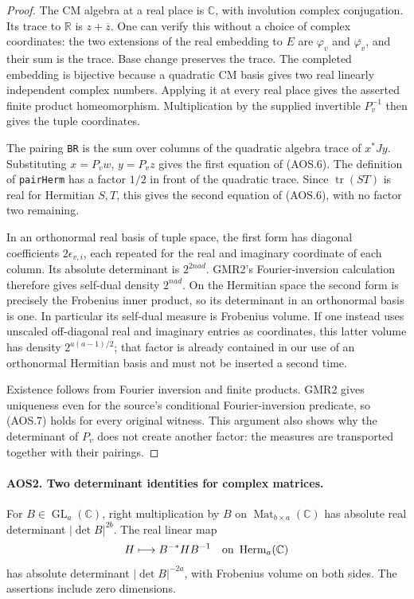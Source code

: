 \documentclass[11pt,a4paper]{article}
\numberwithin{equation}{section}
\theoremstyle{remark}\newtheorem{remark}[theorem]{Remark}
\begin{document}
\begin{proof}
The CM algebra at a real place is $\mathbb C$, with involution complex
conjugation.  Its trace to $\mathbb R$ is $z+\overline z$.
One can verify this without a choice of complex coordinates: the two
extensions of the real embedding to $E$ are $\varphi_v$ and
$\overline{\varphi_v}$, and their sum is the trace.  Base change
preserves the trace.  The completed embedding is bijective because a
quadratic CM basis gives two real linearly independent complex
numbers.  Applying it at every real place gives the asserted finite
product homeomorphism.  Multiplication by the supplied invertible
$P_v^{-1}$ then gives the tuple coordinates.

The pairing \texttt{BR} is the sum over columns of the quadratic
algebra trace of $x^*Jy$.  Substituting $x=P_vw$, $y=P_vz$ gives the
first equation of (AOS.6).  The definition of \texttt{pair\allowbreak Herm} has a
factor $1/2$ in front of the quadratic trace.  Since
$\operatorname{tr}(ST)$ is real for Hermitian $S,T$, this gives the
second equation of (AOS.6), with no factor two remaining.

In an orthonormal real basis of tuple space, the first form has
diagonal coefficients $2\epsilon_{v,i}$, each repeated for the real
and imaginary coordinate of each column.  Its absolute determinant
is $2^{2nad}$.  GMR2's Fourier-inversion calculation therefore gives
self-dual density $2^{nad}$.  On the Hermitian space the second form
is precisely the Frobenius inner product, so its determinant in an
orthonormal basis is one.  In particular its self-dual measure is
Frobenius volume.  If one instead uses unscaled off-diagonal real and
imaginary entries as coordinates, this latter volume has density
$2^{a(a-1)/2}$; that factor is already contained in our use of an
orthonormal Hermitian basis and must not be inserted a second time.

Existence follows from Fourier inversion and finite products.  GMR2
gives uniqueness even for the source's conditional Fourier-inversion
predicate, so (AOS.7) holds for every original witness.  This argument
also shows why the determinant of $P_v$ does not create another
factor: the measures are transported together with their pairings.
\end{proof}

\paragraph{AOS2. Two determinant identities for complex matrices.}
\label{claim:AOS2}
For $B\in\operatorname{GL}_a(\mathbb C)$, right multiplication by $B$
on $\operatorname{Mat}_{b\times a}(\mathbb C)$ has absolute real
determinant $|\det B|^{2b}$.  The real linear map
\[
       H\longmapsto B^{-*}HB^{-1}
       \quad\hbox{on }\operatorname{Herm}_a(\mathbb C)
\]
has absolute determinant $|\det B|^{-2a}$, with Frobenius volume on
both sides.  The assertions include zero dimensions.
\end{document}
